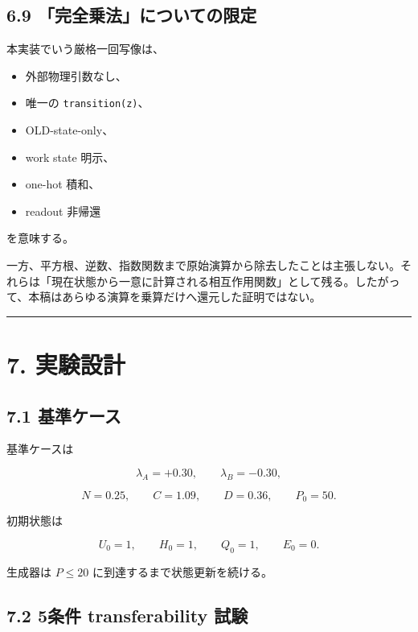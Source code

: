 \documentclass[
  a4paper,
]{ltjsarticle}
\providecommand{\tightlist}{%
  \setlength{\itemsep}{0pt}\setlength{\parskip}{0pt}}
\begin{document}
\subsection{6.9
「完全乗法」についての限定}\label{ux5b8cux5168ux4e57ux6cd5ux306bux3064ux3044ux3066ux306eux9650ux5b9a}

本実装でいう厳格一回写像は、

\begin{itemize}
\tightlist
\item
  外部物理引数なし、
\item
  唯一の \texttt{transition(z)}、
\item
  OLD-state-only、
\item
  work state 明示、
\item
  one-hot 積和、
\item
  readout 非帰還
\end{itemize}

を意味する。

一方、平方根、逆数、指数関数まで原始演算から除去したことは主張しない。それらは「現在状態から一意に計算される相互作用関数」として残る。したがって、本稿はあらゆる演算を乗算だけへ還元した証明ではない。

\begin{center}\rule{0.5\linewidth}{0.5pt}\end{center}

\section{7. 実験設計}\label{ux5b9fux9a13ux8a2dux8a08}

\subsection{7.1 基準ケース}\label{ux57faux6e96ux30b1ux30fcux30b9}

基準ケースは

\[
\lambda_A=+0.30,
\qquad
\lambda_B=-0.30,
\]

\[
N=0.25,
\qquad
C=1.09,
\qquad
D=0.36,
\qquad
P_0=50.
\]

初期状態は

\[
U_0=1,
\qquad
H_0=1,
\qquad
Q_0=1,
\qquad
E_0=0.
\]

生成器は \(P\le20\) に到達するまで状態更新を続ける。

\subsection{7.2 5条件 transferability
試験}\label{ux6761ux4ef6-transferability-ux8a66ux9a13}
\end{document}
